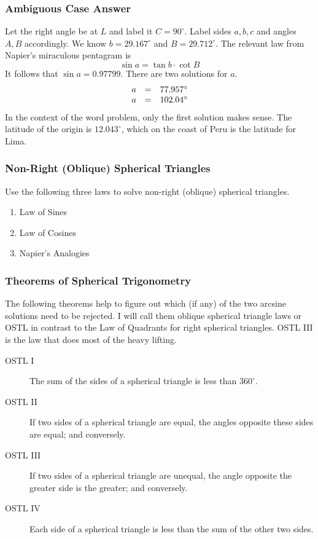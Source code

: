 \documentclass[xcolor=dvipsnames]{beamer}
\begin{document}
\begin{frame}
  \frametitle{Ambiguous Case Answer}
Let the right angle be at $L$ and label it $C=90^{\circ}$. Label sides
$a,b,c$ and angles $A,B$ accordingly. We know $b=29.167^{\circ}$ and
$B=29.712^{\circ}$. The relevant law from Napier's miraculous
pentagram is
\begin{equation}
  \label{eq:saavooba}
  \sin{}a=\tan{}b\cdot\cot{}B
\end{equation}
It follows that $\sin{}a=0.97799$. There are two solutions for $a$.
\begin{equation}
  \label{eq:oongiemi}
  \begin{array}{rcl}
    a&=&77.957^{\circ} \\
    a&=&102.04^{\circ}
  \end{array}\notag
\end{equation}
In the context of the word problem, only the first solution makes
sense. The latitude of the origin is $12.043^{\circ}$, which on the
coast of Peru is the latitude for Lima.
\end{frame}

\begin{frame}
  \frametitle{Non-Right (Oblique) Spherical Triangles}
  Use the following three laws to solve non-right (oblique) spherical
  triangles.
  \begin{enumerate}
  \item Law of Sines
  \item Law of Cosines
  \item Napier's Analogies
  \end{enumerate}
\end{frame}

\begin{frame}
  \frametitle{Theorems of Spherical Trigonometry}
  The following theorems help to figure out which (if any) of the two
  arcsine solutions need to be rejected. I will call them oblique
  spherical triangle laws or OSTL in contrast to the Law of Quadrants
  for right spherical triangles. OSTL III is the law that does most of
  the heavy lifting.
  \begin{description}
  \item[OSTL I] The sum of the sides of a spherical triangle is less than
    $360^{\circ}$.
  \item[OSTL II] If two sides of a spherical triangle are equal, the angles
    opposite these sides are equal; and conversely.
  \item[OSTL III] If two sides of a spherical triangle are unequal, the angle
    opposite the greater side is the greater; and conversely.
  \item[OSTL IV] Each side of a spherical triangle is less than the
    sum of the other two sides.
  \end{description}
\end{frame}
\end{document}
